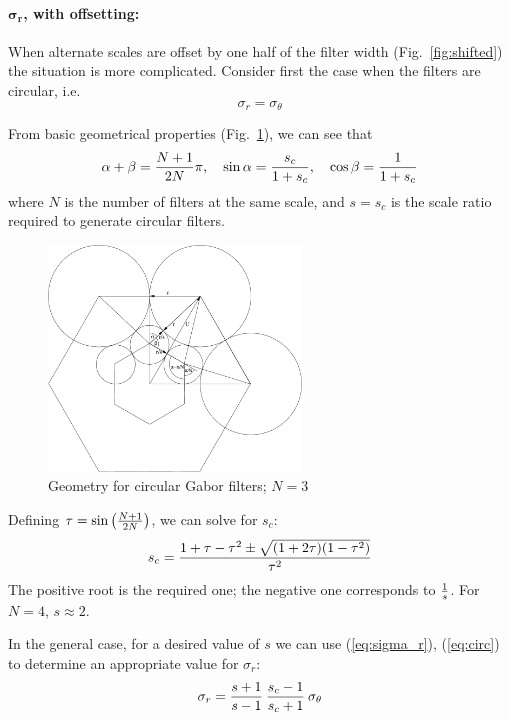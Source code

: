 \documentclass[12pt,a4]{article}
\begin{document}
\paragraph{$\mathbf{\sigma_r}$, with offsetting:}
When alternate scales are offset by one half of the filter width (Fig.~\ref{fig:shifted}) the situation is more complicated.  Consider first the case when the filters are circular, i.e.\ 
\begin{equation}
  \label{eq:circ}
  \sigma_r = \sigma_\theta
\end{equation}

From basic geometrical properties (Fig.~\ref{fig:circles}), we can see that 
\[ \alpha + \beta = {N+1\over 2N}\pi, \quad \sin\alpha = {s_c\over 1+s_c}, \quad \cos\beta = {1\over 1+s_c} \]
where $N$ is the number of filters at the same scale, and $s=s_c$ is the scale ratio required to generate circular filters.
\begin{figure}
  \centering
  \includegraphics[width=0.6\textwidth]{circles}
  \caption{Geometry for circular Gabor filters; $N = 3$}
  \label{fig:circles}
\end{figure}

Defining $\tau = \sin\left({N+1\over 2N}\right)$, we can solve for $s_c$:
\[ s_c = {1+\tau-\tau^2 \pm \sqrt{(1+2\tau)(1-\tau^2)}\over \tau^2} \]
The positive root is the required one; the negative one corresponds to $1\over s$. For $N=4$, $s \approx 2$.

In the general case, for a desired value of $s$ we can use (\ref{eq:sigma_r}), (\ref{eq:circ}) to determine an appropriate value for $\sigma_r$:
\[ \sigma_r = {s+1 \over s-1}\: {s_c-1 \over s_c+1}\: \sigma_\theta \]
\end{document}
